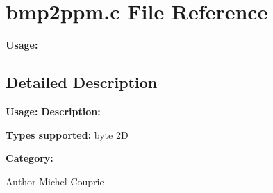 \section{bmp2ppm.c File Reference}
\label{bmp2ppm_8c}


{\bfseries Usage:}  




\subsection{Detailed Description}
{\bfseries Usage:} {\bfseries Description:}

{\bfseries Types supported:} byte 2D

{\bfseries Category:}

\begin{DoxyAuthor}{Author}
Michel Couprie 
\end{DoxyAuthor}
